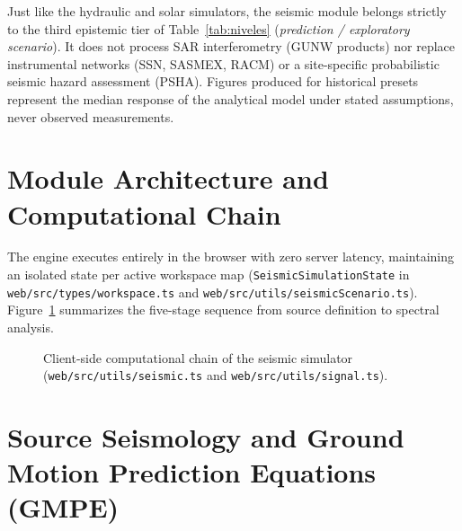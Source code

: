 \documentclass[11pt,a4paper]{article}
\newcommand{\src}[1]{\nolinkurl{#1}}
\begin{document}
\begin{atencion}
Just like the hydraulic and solar simulators, the seismic module belongs strictly to the third epistemic tier of
Table~\ref{tab:niveles} (\emph{prediction / exploratory scenario}). It does not process SAR interferometry (GUNW
products) nor replace instrumental networks (SSN, SASMEX, RACM) or a site-specific probabilistic seismic hazard
assessment (PSHA). Figures produced for historical presets represent the median response of the analytical model
under stated assumptions, never observed measurements.
\end{atencion}

\section{Module Architecture and Computational Chain}
\label{sec:sismo-arquitectura}

The engine executes entirely in the browser with zero server latency, maintaining an isolated state per active
workspace map (\texttt{SeismicSimulationState} in \src{web/src/types/workspace.ts} and
\src{web/src/utils/seismicScenario.ts}). Figure~\ref{fig:flujo-sismo} summarizes the five-stage sequence
from source definition to spectral analysis.

\begin{figure}[htbp]
\centering
{}
\caption{Client-side computational chain of the seismic simulator (\src{web/src/utils/seismic.ts} and
\src{web/src/utils/signal.ts}).}
\label{fig:flujo-sismo}
\end{figure}

\section{Source Seismology and Ground Motion Prediction Equations (GMPE)}
\label{sec:sismo-gmpe}
\end{document}
